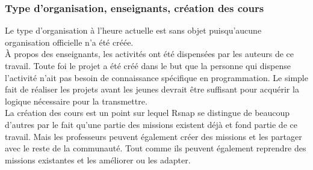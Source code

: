 \subsubsection{Type d'organisation, enseignants, création des cours}
Le type d'organisation à l'heure actuelle est sans objet puisqu'aucune organisation officielle n'a été créée.\\

À propos des enseignants, les activités ont été dispensées par les auteurs de ce travail. Toute foi le projet a été créé dans le but que la personne qui dispense l'activité n'ait pas besoin de connaissance spécifique en programmation. Le simple fait de réaliser les projets avant les jeunes devrait être suffisant pour acquérir la logique nécessaire pour la transmettre.\\

La création des cours est un point sur lequel \gls{Rsnap} se distingue de beaucoup d'autres par le fait qu'une partie des missions existent déjà et fond partie de ce travail. Mais les professeurs peuvent également créer des missions et les partager avec le reste de la communauté. Tout comme ils peuvent également reprendre des missions existantes et les améliorer ou les adapter. %
